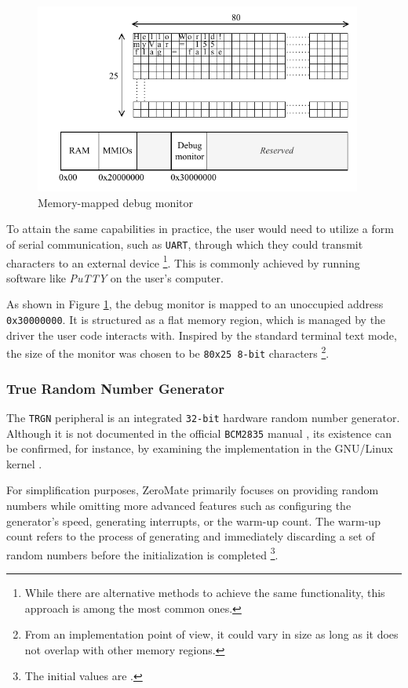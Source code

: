 \documentclass[english, ing, kiv, he, iso690numb, pdf]{fasthesis}
\begin{document}
	\begin{figure}[ht]
		\centering
		\includegraphics[width=0.96\textwidth]{img/diagrams/debug_monitor.pdf}
		\caption{Memory-mapped debug monitor}
		\label{Memory-mapped debug monitor}
	\end{figure}
	
	To attain the same capabilities in practice, the user would need to utilize a form of serial communication, such as \texttt{UART}, through which they could transmit characters to an external device \footnote{While there are alternative methods to achieve the same functionality, this approach is among the most common ones.}. This is commonly achieved by running software like \textit{PuTTY} \cite{putty} on the user's computer.
	
	As shown in Figure \ref{Memory-mapped debug monitor}, the debug monitor is mapped to an unoccupied address \texttt{0x30000000}. It is structured as a flat memory region, which is managed by the driver the user code interacts with. Inspired by the standard terminal text mode, the size of the monitor was chosen to be \texttt{80x25 8-bit} characters \footnote{From an implementation point of view, it could vary in size as long as it does not overlap with other memory regions.}.
	
	\subsubsection{True Random Number Generator} \label{trng}
	The \texttt{TRGN} peripheral is an integrated \texttt{32-bit} hardware random number generator. Although it is not documented in the official \texttt{BCM2835} manual \cite{BCM2835}, its existence can be confirmed, for instance, by examining the implementation in the GNU/Linux kernel \cite{trng}.
	
	For simplification purposes, ZeroMate primarily focuses on providing random numbers while omitting more advanced features such as configuring the generator's speed, generating interrupts, or the warm-up count. The warm-up count refers to the process of generating and immediately discarding a set of random numbers before the initialization is completed \footnote{The initial values are .}.
	
\end{document}
